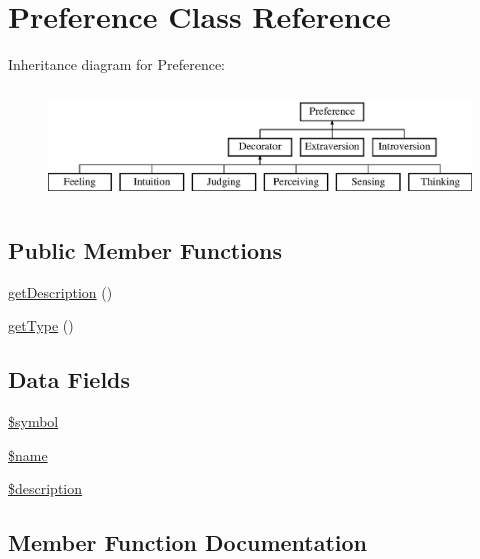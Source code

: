 \hypertarget{class_classes_1_1_preferences_1_1_preference}{}\section{Preference Class Reference}
\label{class_classes_1_1_preferences_1_1_preference}
Inheritance diagram for Preference\+:\begin{figure}[H]
\begin{center}
\leavevmode
\includegraphics[height=3.000000cm]{class_classes_1_1_preferences_1_1_preference}
\end{center}
\end{figure}
\subsection*{Public Member Functions}
\begin{DoxyCompactItemize}
\item 
\hyperlink{class_classes_1_1_preferences_1_1_preference_a2e7bb35c71bf1824456ceb944cb7a845}{get\+Description} ()
\item 
\hyperlink{class_classes_1_1_preferences_1_1_preference_a830b5c75df72b32396701bc563fbe3c7}{get\+Type} ()
\end{DoxyCompactItemize}
\subsection*{Data Fields}
\begin{DoxyCompactItemize}
\item 
\hyperlink{class_classes_1_1_preferences_1_1_preference_aa04ae5f5f106925e87308c0520c0837a}{\$symbol}
\item 
\hyperlink{class_classes_1_1_preferences_1_1_preference_ab2fc40d43824ea3e1ce5d86dee0d763b}{\$name}
\item 
\hyperlink{class_classes_1_1_preferences_1_1_preference_a87b032cba06009e3467abf1c8018d960}{\$description}
\end{DoxyCompactItemize}


\subsection{Member Function Documentation}
\mbox{\label{class_classes_1_1_preferences_1_1_preference_a2e7bb35c71bf1824456ceb944cb7a845}} 
